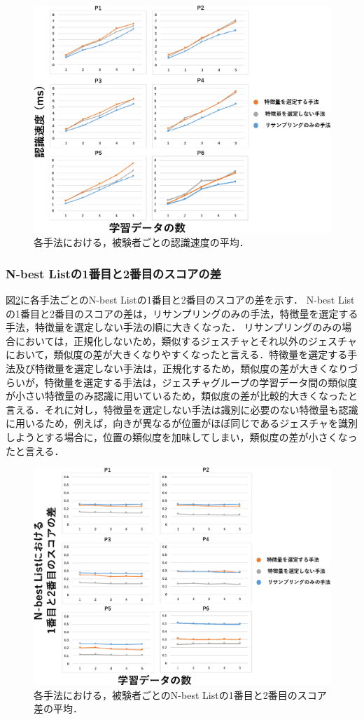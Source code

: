 \begin{figure}[!h]
\centering
\includegraphics[width=0.9\columnwidth]{img/pre_speed.eps}
\caption{各手法における，被験者ごとの認識速度の平均．}
\label{fig:rare_speed}
\end{figure}

\subsubsection{N-best Listの1番目と2番目のスコアの差}
図\ref{fig:rare_diff}に各手法ごとのN-best Listの1番目と2番目のスコアの差を示す．
N-best Listの1番目と2番目のスコアの差は，リサンプリングのみの手法，特徴量を選定する手法，特徴量を選定しない手法の順に大きくなった．
リサンプリングのみの場合においては，正規化しないため，類似するジェスチャとそれ以外のジェスチャにおいて，類似度の差が大きくなりやすくなったと言える．特徴量を選定する手法及び特徴量を選定しない手法は，正規化するため，類似度の差が大きくなりづらいが，特徴量を選定する手法は，ジェスチャグループの学習データ間の類似度が小さい特徴量のみ認識に用いているため，類似度の差が比較的大きくなったと言える．それに対し，特徴量を選定しない手法は識別に必要のない特徴量も認識に用いるため，例えば，向きが異なるが位置がほぼ同じであるジェスチャを識別しようとする場合に，位置の類似度を加味してしまい，類似度の差が小さくなったと言える．

\begin{figure}[!h]
\centering
\includegraphics[width=0.9\columnwidth]{img/pre_diff.eps}
\caption{各手法における，被験者ごとのN-best Listの1番目と2番目のスコア差の平均．}
\label{fig:rare_diff}
\end{figure}

